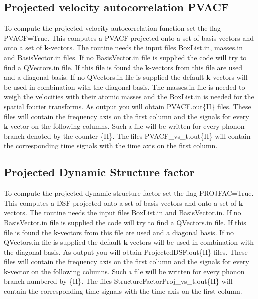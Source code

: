 \documentclass[a4paper,12pt]{article}
\begin{document}
\subsection{Projected velocity autocorrelation PVACF}
To compute the projected velocity autocorrelation function
set the flag\\ PVACF=True. This computes a PVACF projected onto
a set of basis vectors and onto a set of $\mathbf{k}$-vectors.
The routine needs the input files BoxList.in, masses.in and
BasisVector.in files. If no BasisVector.in file is supplied
the code will try to find a QVectors.in file. If this file
is found the $\mathbf{k}$-vectors from this file are used
and a diagonal basis. If no QVectors.in file
is supplied the default $\mathbf{k}$-vectors will be used
in combination with the diagonal basis.
The masses.in file is needed to weigh the velocities with their
atomic masses and the BoxList.in is needed for the spatial
fourier transforms.
As output you will obtain PVACF.out\{II\} files. These 
files will contain the frequency axis on the first column and
the signals for every $\mathbf{k}$-vector on the following columns.
Such a file will be written for every phonon branch denoted by the counter
\{II\}. The files PVACF\_vs\_t.out\{II\} will contain the corresponding
time signals with the time axis on the first column.




\subsection{Projected Dynamic Structure factor}
To compute the projected dynamic structure factor
set the flag PROJFAC=True. This computes a DSF projected onto
a set of basis vectors and onto a set of $\mathbf{k}$-vectors.
The routine needs the input files BoxList.in and
BasisVector.in. If no BasisVector.in file is supplied
the code will try to find a QVectors.in file. If this file
is found the $\mathbf{k}$-vectors from this file are used
and a diagonal basis. If no QVectors.in file
is supplied the default $\mathbf{k}$-vectors will be used
in combination with the diagonal basis.
As output you will obtain ProjectedDSF.out\{II\} files. These 
files will contain the frequency axis on the first column and
the signals for every $\mathbf{k}$-vector on the following columns.
Such a file will be written for every phonon branch numbered by \{II\}.
The files StructureFactorProj\_vs\_t.out\{II\} will contain the corresponding
time signals with the time axis on the first column.
\end{document}
